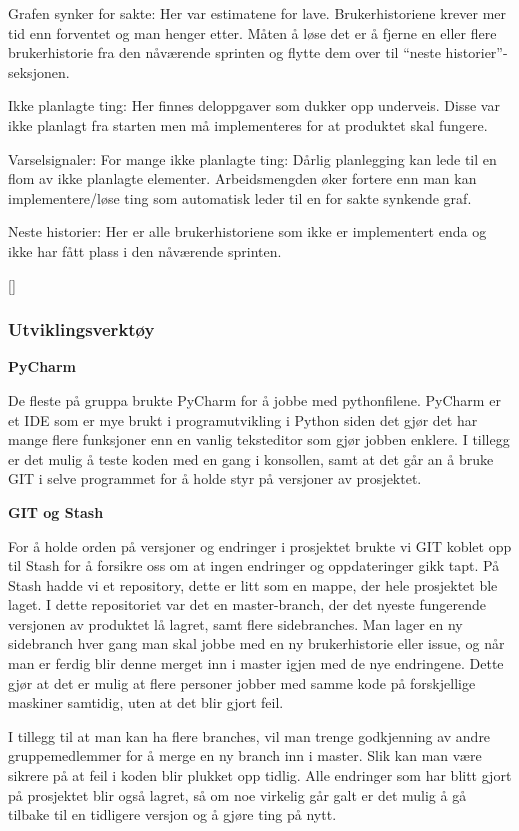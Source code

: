 \documentclass[12pt,a4paper,norsk]{article}
\begin{document}
	Grafen synker for sakte:
    Her var estimatene for lave. Brukerhistoriene krever mer tid enn forventet og man henger etter. Måten å løse det er å fjerne en eller flere brukerhistorie fra den nåværende sprinten og flytte dem over til “neste historier”-seksjonen.

    Ikke planlagte ting:
    Her finnes deloppgaver som dukker opp underveis. Disse var ikke planlagt fra starten men må implementeres for at produktet skal fungere.

    Varselsignaler:
	For mange ikke planlagte ting:
    Dårlig planlegging kan lede til en flom av ikke planlagte elementer. Arbeidsmengden øker fortere enn man kan implementere/løse ting som automatisk leder til en for sakte synkende graf.

    Neste historier:
    Her er alle brukerhistoriene som ikke er implementert enda og ikke har fått plass i den nåværende sprinten.
    
    [\cite{kniberg}]


	\subsubsection{Utviklingsverktøy}

\textbf{PyCharm}
\par De fleste på gruppa brukte PyCharm for å jobbe med pythonfilene. PyCharm er et IDE som er mye brukt i programutvikling i Python siden det gjør det har mange flere funksjoner enn en vanlig teksteditor som gjør jobben enklere. I tillegg er det mulig å teste koden med en gang i konsollen, samt at det går an å bruke GIT i selve programmet for å holde styr på versjoner av prosjektet.

\bigskip \noindent \textbf{GIT og Stash}
\par For å holde orden på versjoner og endringer i prosjektet brukte vi GIT koblet opp til Stash for å forsikre oss om at ingen endringer og oppdateringer gikk tapt. På Stash hadde vi et repository, dette er litt som en mappe, der hele prosjektet ble laget. I dette repositoriet var det en master-branch, der det nyeste fungerende versjonen av produktet lå lagret, samt flere sidebranches. Man lager en ny sidebranch hver gang man skal jobbe med en ny brukerhistorie eller issue, og når man er ferdig blir denne merget inn i master igjen med de nye endringene. Dette gjør at det er mulig at flere personer jobber med samme kode på forskjellige maskiner samtidig, uten at det blir gjort feil.

I tillegg til at man kan ha flere branches, vil man trenge godkjenning av andre gruppemedlemmer for å merge en ny branch inn i master. Slik kan man være sikrere på at feil i koden blir plukket opp tidlig. Alle endringer som har blitt gjort på prosjektet blir også lagret, så om noe virkelig går galt er det mulig å gå tilbake til en tidligere versjon og å gjøre ting på nytt.
\end{document}
